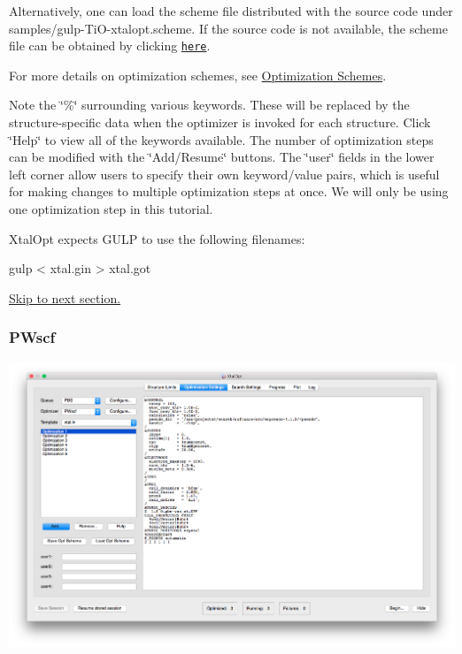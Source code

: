 Alternatively, one can load the scheme file distributed with the source code under samples/gulp-\/\+Ti\+O-\/xtalopt.\+scheme. If the source code is not available, the scheme file can be obtained by clicking \href{http://xtalopt.github.io/samples/gulp-TiO-xtalopt.scheme}{\tt here}.

For more details on optimization schemes, see \hyperlink{optschemes}{Optimization Schemes}.

Note the \char`\"{}\%\char`\"{} surrounding various keywords. These will be replaced by the structure-\/specific data when the optimizer is invoked for each structure. Click \char`\"{}\+Help\char`\"{} to view all of the keywords available. The number of optimization steps can be modified with the \char`\"{}\+Add/\+Resume\char`\"{} buttons. The \char`\"{}user\char`\"{} fields in the lower left corner allow users to specify their own keyword/value pairs, which is useful for making changes to multiple optimization steps at once. We will only be using one optimization step in this tutorial.

Xtal\+Opt expects G\+U\+L\+P to use the following filenames\+:


\begin{DoxyCode}
gulp < xtal.gin > xtal.got
\end{DoxyCode}


\hyperlink{tut-xo_qisetup}{Skip to next section.}\hypertarget{tut-xo_pwscf-opt}{}\subsubsection{P\+Wscf}\label{tut-xo_pwscf-opt}
 
\begin{DoxyImageNoCaption}
  \mbox{\includegraphics[width=\textwidth]{opt-set-pwscf.png}}
\end{DoxyImageNoCaption}


